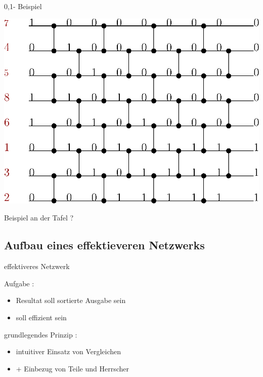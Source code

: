 \documentclass[ucs,9pt]{beamer}
\begin{document}
\begin{frame}{0,1- Beispiel}
 {
\begin{center}
\includegraphics[scale=0.8]{01beispiel.eps}
\end{center}
}
 {\begin{center} {\color{green}Beispiel an der Tafel ?}\end{center} }
\end{frame}

\subsection*{Aufbau eines effektieveren Netzwerks}
\begin{frame}{effektiveres Netzwerk}
 {Aufgabe :
            \begin{itemize}
                \item Resultat soll sortierte Ausgabe sein
                \item \alert{soll effizient sein}
            \end{itemize}}
 {grundlegendes Prinzip :
            \begin{itemize}
                \item intuitiver Einsatz von Vergleichen
                \item[]\alert{+ Einbezug von Teile und Herrscher}
            \end{itemize}}
\end{frame}
\end{document}

